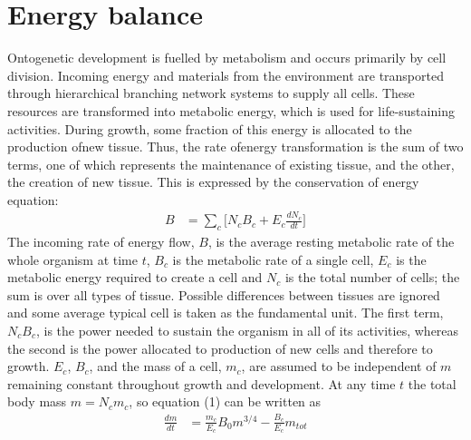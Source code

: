 \documentclass[a4paper]{article} %
\begin{document}
\newpage

\section{Energy balance}
Ontogenetic development is fuelled by metabolism and occurs primarily by cell division. Incoming energy and materials from the environment are transported through hierarchical branching network systems to supply all cells. These resources are transformed into metabolic energy, which is used for life-sustaining activities. During growth, some fraction of this energy is allocated to the production ofnew tissue. Thus, the rate ofenergy transformation is the sum of two terms, one of which represents the maintenance of existing tissue, and the other, the creation of new tissue. This is expressed by the conservation of energy equation:
\begin{align}
    B &= \sum_c \Bigg[N_{c}B_{c} + E_{c}\frac{dN_{c}}{dt}\Bigg]
\end{align}
The incoming rate of energy flow, $B$, is the average resting metabolic rate of the whole organism at time $t$, $B_c$ is the metabolic rate of a single cell, $E_c$ is the metabolic energy required to create a cell and $N_c$ is the total number of cells; the sum is over all types of tissue. Possible differences between tissues are ignored and some average typical cell is taken as the fundamental unit. The first term, $N_{c}B_{c}$, is the power needed to sustain the organism in all of its activities, whereas the second is the power allocated to production of new cells and therefore to growth. $E_c$, $B_c$, and the mass of a cell, $m_c$, are assumed to be independent of $m$ remaining constant throughout growth and development. At any time $t$ the total body mass $m = N_{c}m_{c}$, so equation (1) can be written as
\begin{align}
    \frac{dm}{dt} &= \frac{m_c}{E_c}B_{0}m^{3/4} - \frac{B_{c}}{E_c}m_{tot}
\end{align}
\end{document}
